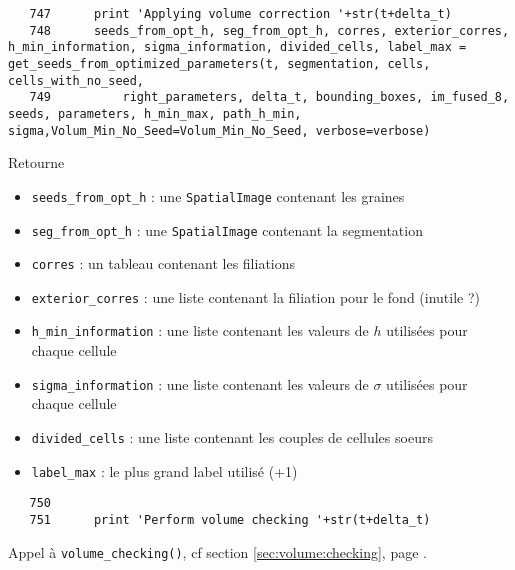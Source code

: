 \documentclass{article}
\def \mycolor {red}
\begin{document}
\color{black}
\begin{verbatim} 
   747	    print 'Applying volume correction '+str(t+delta_t)
   748	    seeds_from_opt_h, seg_from_opt_h, corres, exterior_corres, h_min_information, sigma_information, divided_cells, label_max = get_seeds_from_optimized_parameters(t, segmentation, cells, cells_with_no_seed, 
   749	        right_parameters, delta_t, bounding_boxes, im_fused_8, seeds, parameters, h_min_max, path_h_min, sigma,Volum_Min_No_Seed=Volum_Min_No_Seed, verbose=verbose)
\end{verbatim}
\color{\mycolor}
Retourne
\begin{itemize}
\itemsep -0.5ex
\item \verb|seeds_from_opt_h| : une \texttt{SpatialImage} contenant les graines 
\item \verb|seg_from_opt_h| : une \texttt{SpatialImage} contenant la segmentation
\item \verb|corres| : un tableau contenant les filiations
\item \verb|exterior_corres| : une liste contenant la filiation pour le fond (inutile ?)
\item \verb|h_min_information| : une liste contenant les valeurs de $h$ utilisées pour chaque cellule
\item \verb|sigma_information| : une liste contenant les valeurs de $\sigma$ utilisées pour chaque cellule
\item \verb|divided_cells| : une liste contenant les couples de cellules soeurs
\item \verb|label_max| : le plus grand label utilisé (+1)
\end{itemize}
\color{black}
\begin{verbatim}
   750	    
   751	    print 'Perform volume checking '+str(t+delta_t)
\end{verbatim} 
\color{\mycolor}
Appel \`a \texttt{volume\_checking()}, cf section \ref{sec:volume:checking}, page \pageref{sec:volume:checking}.
\end{document}
